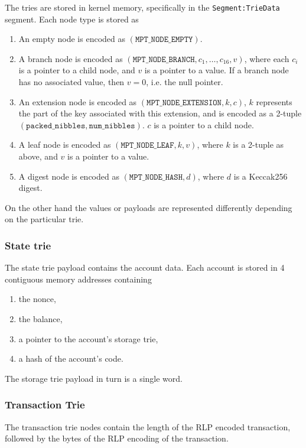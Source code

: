 The tries are stored in kernel memory, specifically in the {\tt Segment:TrieData} segment. Each node type is stored as
\begin{enumerate}
  \item An empty node is encoded as $(\texttt{MPT\_NODE\_EMPTY})$.
  \item A branch node is encoded as $(\texttt{MPT\_NODE\_BRANCH}, c_1, \dots, c_{16}, v)$, where each $c_i$ is a pointer to a child node, and $v$ is a pointer to a value. If a branch node has no associated value, then $v = 0$, i.e. the null pointer.
  \item An extension node is encoded as $(\texttt{MPT\_NODE\_EXTENSION}, k, c)$, $k$ represents the part of the key associated with this extension, and is encoded as a 2-tuple $(\texttt{packed\_nibbles}, \texttt{num\_nibbles})$. $c$ is a pointer to a child node.
  \item A leaf node is encoded as $(\texttt{MPT\_NODE\_LEAF}, k, v)$, where $k$ is a 2-tuple as above, and $v$ is a pointer to a value.
  \item A digest node is encoded as $(\texttt{MPT\_NODE\_HASH}, d)$, where $d$ is a Keccak256 digest.
\end{enumerate}

On the other hand the values or payloads are represented differently depending on the particular trie.

\subsubsection{State trie}
The state trie payload contains the account data. Each account is stored in 4 contiguous memory addresses containing
\begin{enumerate}
	\item the nonce,
	\item the balance,
	\item a pointer to the account's storage trie,
	\item a hash of the account's code.
\end{enumerate}
The storage trie payload in turn is a single word.

\subsubsection{Transaction Trie}
The transaction trie nodes contain the length of the RLP encoded transaction, followed by the bytes of the RLP encoding of the transaction.

